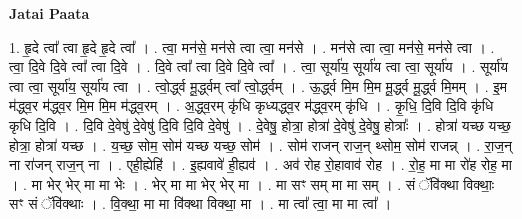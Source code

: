 \documentclass[17pt]{extarticle}
\begin{document}
\textbf{Jatai Paata} \newline

1. हृ॒दे त्वा᳚ त्वा हृ॒दे हृ॒दे त्वा᳚ । . त्वा॒ मन॑से॒ मन॑से त्वा त्वा॒ मन॑से । . मन॑से त्वा त्वा॒ मन॑से॒ मन॑से त्वा । . त्वा॒ दि॒वे दि॒वे त्वा᳚ त्वा दि॒वे । . दि॒वे त्वा᳚ त्वा दि॒वे दि॒वे त्वा᳚ । . त्वा॒ सूर्या॑य॒ सूर्या॑य त्वा त्वा॒ सूर्या॑य । . सूर्या॑य त्वा त्वा॒ सूर्या॑य॒ सूर्या॑य त्वा । . त्वो॒र्द्ध्व मू॒र्द्ध्वम् त्वा᳚ त्वो॒र्द्ध्वम् । . ऊ॒र्द्ध्व मि॒म मि॒म मू॒र्द्ध्व मू॒र्द्ध्व मि॒मम् । . इ॒म म॑द्ध्व॒र म॑द्ध्व॒र मि॒म मि॒म म॑द्ध्व॒रम् । . अ॒द्ध्व॒रम् कृ॑धि कृध्यद्ध्व॒र म॑द्ध्व॒रम् कृ॑धि । . कृ॒धि॒ दि॒वि दि॒वि कृ॑धि कृधि दि॒वि । . दि॒वि दे॒वेषु॑ दे॒वेषु॑ दि॒वि दि॒वि दे॒वेषु॑ । . दे॒वेषु॒ होत्रा॒ होत्रा॑ दे॒वेषु॑ दे॒वेषु॒ होत्राः᳚ । . होत्रा॑ यच्छ यच्छ॒ होत्रा॒ होत्रा॑ यच्छ । . य॒च्छ॒ सोम॒ सोम॑ यच्छ यच्छ॒ सोम॑ । . सोम॑ राजन् राज॒न् थ्सोम॒ सोम॑ राजन्न् । . रा॒ज॒न् ना रा॑जन् राज॒न् ना । . एही॒ह्येहि॑ । . इ॒ह्यवावे॑ ही॒ह्यव॑ । . अव॑ रोह रो॒हावाव॑ रोह । . रो॒ह॒ मा मा रो॑ह रोह॒ मा । . मा भेर् भेर् मा मा भेः । . भेर् मा मा भेर् भेर् मा । . मा सꣳ सम् मा मा सम् । . सं ॅवि॑क्था विक्थाः॒ सꣳ सं ॅवि॑क्थाः । . वि॒क्था॒ मा मा वि॑क्था विक्था॒ मा । . मा त्वा᳚ त्वा॒ मा मा त्वा᳚ । \newline
\end{document}
